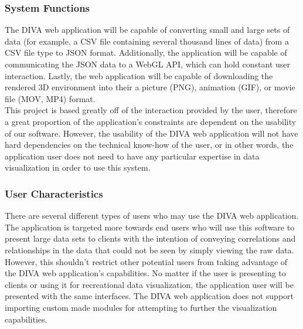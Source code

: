 \documentclass[journal,10pt,onecolumn,compsoc]{IEEEtran} \usepackage[margin=1.0in]{geometry} \usepackage{pdfpages}
\begin{document}
        \subsubsection{System Functions}
        The DIVA web application will be capable of converting small and large sets of data (for example, a CSV file containing several thousand lines of data) from a CSV file type to JSON format. Additionally, the application will be capable of communicating the JSON data to a WebGL API, which can hold constant user interaction. Lastly, the web application will be capable of downloading the rendered 3D environment into their a picture (PNG), animation (GIF), or movie file (MOV, MP4) format. \\
        \newline This project is based greatly off of the interaction provided by the user, therefore a great proportion of the application's constraints are dependent on the usability of our software. However, the usability of the DIVA web application will not have hard dependencies on the technical know-how of the user, or in other words, the application user does not need to have any particular expertise in data visualization in order to use this system. 
        \subsubsection{User Characteristics}
        There are several different types of users who may use the DIVA web application. The application is targeted more towards end users who will use this software to present large data sets to clients with the intention of conveying correlations and relationships in the data that could not be seen by simply viewing the raw data. However, this shouldn't restrict other potential users from taking advantage of the DIVA web application's capabilities. No matter if the user is presenting to clients or using it for recreational data visualization, the application user will be presented with the same interfaces. The DIVA web application does not support importing custom made modules for attempting to further the visualization capabilities. 
\end{document}
